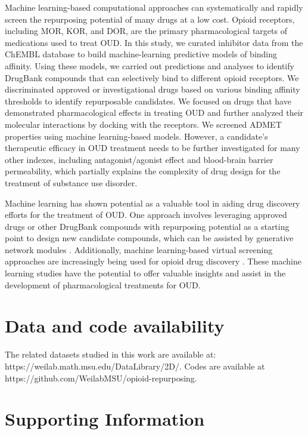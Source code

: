 \documentclass[10pt]{article}
\begin{document}
		Machine learning-based computational approaches can systematically and rapidly screen the repurposing potential of many drugs at a low cost. Opioid receptors, including MOR, KOR, and DOR, are the primary pharmacological targets of medications used to treat OUD. In this study, we curated inhibitor data from the ChEMBL database to build machine-learning predictive models of binding affinity. Using these models, we carried out predictions and analyses to identify DrugBank compounds that can selectively bind to different opioid receptors. We discriminated approved or investigational drugs based on various binding affinity thresholds to identify repurposable candidates. We focused on drugs that have demonstrated pharmacological effects in treating OUD and further analyzed their molecular interactions by docking with the receptors. We screened ADMET properties using machine learning-based models. However, a candidate's therapeutic efficacy in OUD treatment needs to be further investigated for many other indexes, including antagonist/agonist effect and blood-brain barrier permeability, which partially explains the complexity of drug design for the treatment of substance use disorder.
		
		
		Machine learning has shown potential as a valuable tool in aiding drug discovery efforts for the treatment of OUD. One approach involves leveraging approved drugs or other DrugBank compounds with repurposing potential as a starting point to design new candidate compounds, which can be assisted by generative network modules \cite{gao2020generative}. Additionally, machine learning-based virtual screening approaches are increasingly being used for opioid drug discovery \cite{jia2021construction, sakamuru2021predictive}. These machine learning studies have the potential to offer valuable insights and assist in the development of pharmacological treatments for OUD.
		
	
		\section*{Data and code availability}

	The related datasets studied in this work are available at: 
	https://weilab.math.msu.edu/DataLibrary/2D/. Codes are available at https://github.com/WeilabMSU/opioid-repurposing. 

		\section*{Supporting Information}
	
\end{document}
